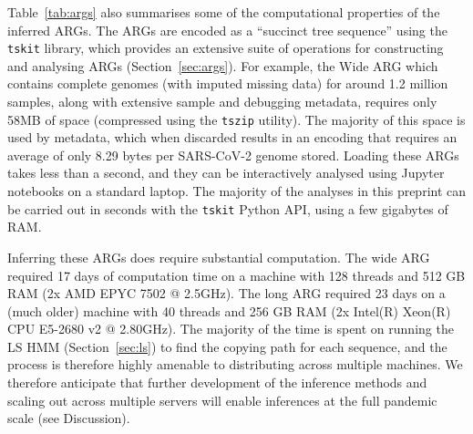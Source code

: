 \documentclass{article}
\begin{document}
Table~\ref{tab:args} also summarises some of the computational
properties of the inferred ARGs.
The ARGs are encoded as a ``succinct tree sequence'' using
the \texttt{tskit} library, which provides an extensive
suite of operations for constructing and analysing ARGs
(Section~\ref{sec:args}). For example, the Wide ARG
which contains complete genomes (with imputed missing data)
for around 1.2 million samples, along with extensive sample
and debugging metadata, requires only 58MB of space (compressed
using the \texttt{tszip} utility). The majority of this
space is used by metadata, which when discarded results in
an encoding that requires an average of only 8.29 bytes per
SARS-CoV-2 genome stored.
Loading these ARGs takes less than a second, and they can be interactively
analysed using Jupyter notebooks on a standard laptop. The majority
of the analyses in this preprint can be carried out in seconds
with the \texttt{tskit} Python API, using a few gigabytes of RAM.

Inferring these ARGs does require substantial computation.
The wide ARG required 17 days of computation time on a machine with
128 threads and 512 GB RAM (2x AMD EPYC 7502 @ 2.5GHz). The long ARG
required 23 days on a (much older) machine with 40 threads and 256 GB RAM (2x
Intel(R) Xeon(R) CPU E5-2680 v2 @ 2.80GHz). The majority of the time is spent
on running the LS HMM (Section~\ref{sec:ls}) to find the copying
path for each sequence, and the process
is therefore highly amenable to distributing across multiple machines.
We therefore anticipate that further development of the
inference methods and scaling out across multiple servers will
enable inferences at the full pandemic scale
(see Discussion).
\end{document}
